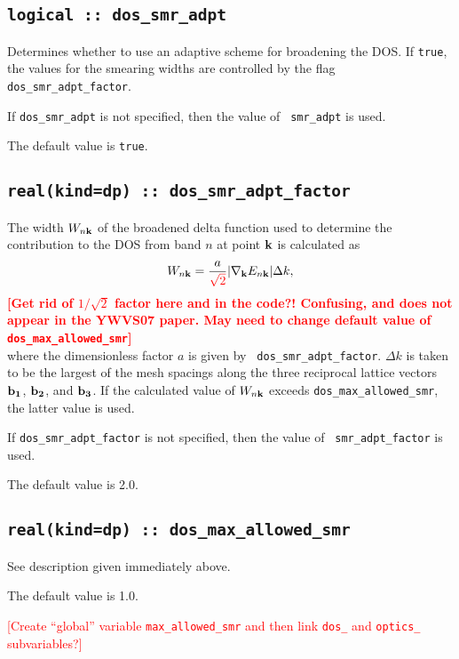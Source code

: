 \subsection[dos\_smr\_adpt]{\tt logical :: dos\_smr\_adpt}
Determines whether to use an adaptive scheme for broadening the
DOS. If \verb#true#, the values for the smearing widths are 
controlled by the flag {\tt dos\_smr\_adpt\_factor}.

If {\tt dos\_smr\_adpt} is not specified, then the value of {\tt
  smr\_adpt} is used.  

The default value is \verb#true#.


\subsection[dos\_smr\_adpt\_factor]{\tt real(kind=dp) :: dos\_smr\_adpt\_factor}

The width $W_{n{\bf k}}$ of the broadened delta function used to
determine the contribution to the DOS from band $n$ at point ${\bf k}$
is calculated as
%
$$
W_{n{\bf k}}=\frac{a}{\textcolor{red}{\sqrt{2}}}\vert
\nabla_{\bf k} E_{n{\bf k}}\vert \Delta k,
$$ 
%
\textcolor{red}{{\bf [Get rid of $1/\sqrt{2}$ factor here and in the code?! 
Confusing, and does not appear in the YWVS07 paper. May need to change default value of
{\tt dos\_max\_allowed\_smr}]}}\\
where the dimensionless factor $a$ is given by {\tt
  dos\_smr\_adpt\_factor}. $\Delta k$ is taken to be the largest of
the mesh spacings along the three reciprocal lattice vectors ${\bf
  b_1}$, ${\bf b_2}$, and ${\bf b_3}$.  If the calculated value of
$W_{n{\bf k}}$ exceeds {\tt dos\_max\_allowed\_smr}, the latter
value is used.

If {\tt dos\_smr\_adpt\_factor} is not specified, then the value of {\tt
  smr\_adpt\_factor} is used.  

The default value is 2.0.


\subsection[dos\_max\_allowed\_smr]{\tt real(kind=dp) ::
  dos\_max\_allowed\_smr}

See description given immediately above.

The default value is 1.0.

\textcolor{red}{[Create ``global'' variable {\tt max\_allowed\_smr} and then link
{\tt dos\_} and {\tt optics\_} subvariables?]}


